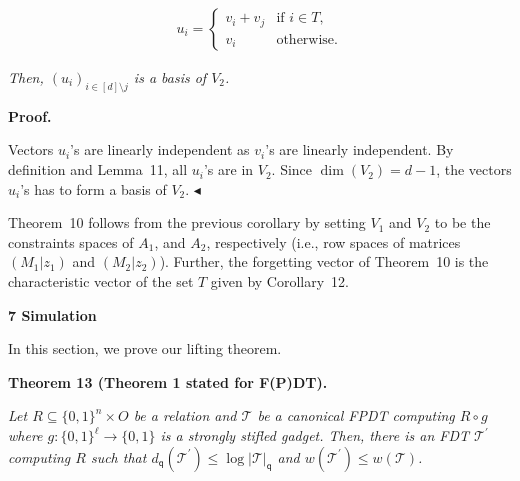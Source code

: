 \[\begin{gathered}
u_{i}=\begin{cases}v_{i}+v_{j}&\text{if $i\in T$,}\\
v_{i}&\text{otherwise.}\end{cases}
\end{gathered}\]


\emph{Then, $(u_{i})_{i\in[d]\setminus j}$ is a basis of $V_{2}$.}\par







\par\medskip\noindent\textbf{Proof.}\par




Vectors $u_{i}$’s are linearly independent as $v_{i}$’s are linearly independent.
By definition and Lemma 11, all $u_{i}$’s are in $V_{2}$.
Since $\dim(V_{2})=d-1$, the vectors $u_{i}$’s has to form a basis of $V_{2}$.
$\blacktriangleleft$\par




Theorem 10 follows from the previous corollary by setting $V_{1}$ and $V_{2}$ to be the constraints spaces of $A_{1}$, and $A_{2}$, respectively (i.e., row spaces of matrices $(M_{1}|z_{1})$ and $(M_{2}|z_{2})$). Further, the forgetting vector of Theorem 10 is the characteristic vector of the set $T$ given by Corollary 12.\par






\par\medskip\noindent\textbf{
7 Simulation}\par




In this section, we prove our lifting theorem.\par





\par\medskip\noindent\textbf{
\textbf{Theorem 13}\textbf{ }(Theorem 1 stated for F(P)DT)\textbf{.}
}\par



\emph{Let $R\subseteq\{0,1\}^{n}\times O$ be a relation and $\mathcal{T}$ be a canonical FPDT computing $R\circ g$ where $g:\{0,1\}^{\ell}\to\{0,1\}$ is a strongly stifled gadget.
Then, there is an FDT $\mathcal{T}^{\prime}$ computing $R$ such that $d_{\mathsf{q}}(\mathcal{T}^{\prime})\leq\log|\mathcal{T}|_{\mathsf{q}}$ and $w(\mathcal{T}^{\prime})\leq w(\mathcal{T})$.}\par




